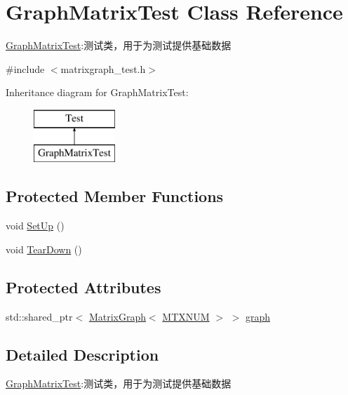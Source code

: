 \hypertarget{class_graph_matrix_test}{}\section{Graph\+Matrix\+Test Class Reference}
\label{class_graph_matrix_test}


\hyperlink{class_graph_matrix_test}{Graph\+Matrix\+Test}\+:测试类，用于为测试提供基础数据  




{\ttfamily \#include $<$matrixgraph\+\_\+test.\+h$>$}

Inheritance diagram for Graph\+Matrix\+Test\+:\begin{figure}[H]
\begin{center}
\leavevmode
\includegraphics[height=2.000000cm]{class_graph_matrix_test}
\end{center}
\end{figure}
\subsection*{Protected Member Functions}
\begin{DoxyCompactItemize}
\item 
void \hyperlink{class_graph_matrix_test_a0bf059febd79340f3fd0a07998b86084}{Set\+Up} ()
\item 
void \hyperlink{class_graph_matrix_test_a6ecc6a16df121b02fd29a278f38083c9}{Tear\+Down} ()
\end{DoxyCompactItemize}
\subsection*{Protected Attributes}
\begin{DoxyCompactItemize}
\item 
std\+::shared\+\_\+ptr$<$ \hyperlink{struct_introduction_to_algorithm_1_1_graph_algorithm_1_1_matrix_graph}{Matrix\+Graph}$<$ \hyperlink{matrixgraph__test_8h_acc7846ac7d1dfc1d99a61d3130aa616b}{M\+T\+X\+N\+U\+M} $>$ $>$ \hyperlink{class_graph_matrix_test_a466258802e52f0a5408f78e809cd6d7c}{graph}
\end{DoxyCompactItemize}


\subsection{Detailed Description}
\hyperlink{class_graph_matrix_test}{Graph\+Matrix\+Test}\+:测试类，用于为测试提供基础数据 

